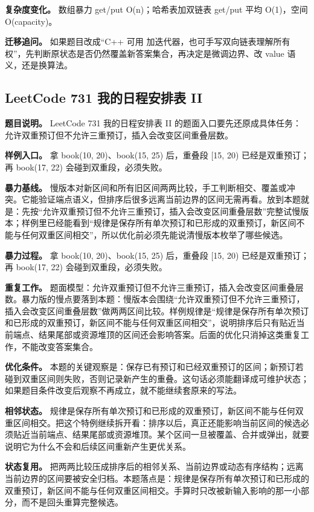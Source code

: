 \textbf{复杂度变化。} 数组暴力 get/put O(n)；哈希表加双链表 get/put 平均 O(1)，空间 O(capacity)。

\textbf{迁移追问。} 如果题目改成“C++ 可用  加迭代器，也可手写双向链表理解所有权”，先判断原状态是否仍然覆盖新答案集合，再决定是微调边界、改 value 语义，还是换算法。

\subsection{LeetCode 731 我的日程安排表 II}

\textbf{题目说明。} LeetCode 731 我的日程安排表 II 的题面入口要先还原成具体任务：允许双重预订但不允许三重预订，插入会改变区间重叠层数。

\textbf{样例入口。} 拿 book(10, 20)、book(15, 25) 后，重叠段 [15, 20) 已经是双重预订；再 book(17, 22) 会碰到双重段，必须失败。

\textbf{暴力基线。} 慢版本对新区间和所有旧区间两两比较，手工判断相交、覆盖或冲突。它能验证端点语义，但排序后很多远离当前边界的区间无需再看。放到本题就是：先按“允许双重预订但不允许三重预订，插入会改变区间重叠层数”完整试慢版本；样例里已经能看到“规律是保存所有单次预订和已形成的双重预订，新区间不能与任何双重区间相交”，所以优化前必须先能说清慢版本枚举了哪些候选。

\textbf{暴力过程。} 拿 book(10, 20)、book(15, 25) 后，重叠段 [15, 20) 已经是双重预订；再 book(17, 22) 会碰到双重段，必须失败。

\textbf{重复工作。} 题面模型：允许双重预订但不允许三重预订，插入会改变区间重叠层数。暴力版的慢点要落到本题：慢版本会围绕“允许双重预订但不允许三重预订，插入会改变区间重叠层数”做两两区间比较。样例规律是“规律是保存所有单次预订和已形成的双重预订，新区间不能与任何双重区间相交”，说明排序后只有贴近当前端点、结果尾部或资源堆顶的区间还会影响答案。后面的优化只消掉这类重复工作，不能改变答案集合。

\textbf{优化条件。} 本题的关键观察是：保存已有预订和已经双重预订的区间；新预订若碰到双重区间则失败，否则记录新产生的重叠。这句话必须能翻译成可维护状态；如果题目条件改变后观察不再成立，就不能继续套原来的写法。

\textbf{相邻状态。} 规律是保存所有单次预订和已形成的双重预订，新区间不能与任何双重区间相交。把这个特例继续拆开看：排序以后，真正还能影响当前区间的候选必须贴近当前端点、结果尾部或资源堆顶。某个区间一旦被覆盖、合并或弹出，就要说明它为什么不会和后续区间重新产生更优关系。

\textbf{状态复用。} 把两两比较压成排序后的相邻关系、当前边界或动态有序结构；远离当前边界的区间要被安全归档。本题落点是：规律是保存所有单次预订和已形成的双重预订，新区间不能与任何双重区间相交。手算时只改被新输入影响的那一小部分，而不是回头重算完整候选。

